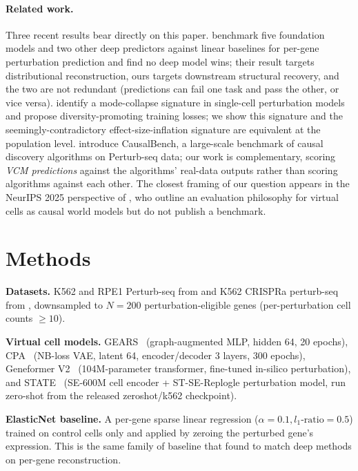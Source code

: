 \documentclass{article}
\begin{document}
\paragraph{Related work.}
Three recent results bear directly on this paper. \citet{ahlmanneltze2025} benchmark five foundation models and two other deep predictors against linear baselines for per-gene perturbation prediction and find no deep model wins; their result targets distributional reconstruction, ours targets downstream structural recovery, and the two are not redundant (predictions can fail one task and pass the other, or vice versa). \citet{mejia2025diversity} identify a mode-collapse signature in single-cell perturbation models and propose diversity-promoting training losses; we show this signature and the seemingly-contradictory effect-size-inflation signature are equivalent at the population level. \citet{chevalley2025causalbench} introduce CausalBench, a large-scale benchmark of causal discovery algorithms on Perturb-seq data; our work is complementary, scoring \emph{VCM predictions} against the algorithms' real-data outputs rather than scoring algorithms against each other. The closest framing of our question appears in the NeurIPS 2025 perspective of \citet{vc_causal_2025}, who outline an evaluation philosophy for virtual cells as causal world models but do not publish a benchmark.

\section{Methods}
\label{sec:methods}
\textbf{Datasets.} K562 and RPE1 Perturb-seq from \citet{replogle2022} and K562 CRISPRa perturb-seq from \citet{norman2019}, downsampled to $N=200$ perturbation-eligible genes (per-perturbation cell counts $\geq 10$).

\textbf{Virtual cell models.} GEARS~\citep{roohani2024gears} (graph-augmented MLP, hidden 64, 20 epochs), CPA~\citep{lotfollahi2023cpa} (NB-loss VAE, latent 64, encoder/decoder 3 layers, 300 epochs), Geneformer V2~\citep{theodoris2023geneformer} (104M-parameter transformer, fine-tuned in-silico perturbation), and STATE~\citep{arc2025state} (SE-600M cell encoder + ST-SE-Replogle perturbation model, run zero-shot from the released zeroshot/k562 checkpoint).

\textbf{ElasticNet baseline.} A per-gene sparse linear regression ($\alpha = 0.1, l_1\text{-ratio} = 0.5$) trained on control cells only and applied by zeroing the perturbed gene's expression. This is the same family of baseline that \citet{ahlmanneltze2025} found to match deep methods on per-gene reconstruction.
\end{document}
